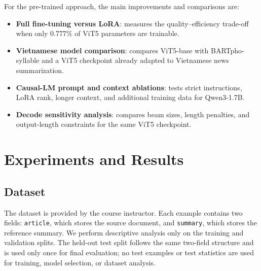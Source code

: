 \documentclass[conference]{IEEEtran}
\begin{document}
For the pre-trained approach, the main improvements and comparisons are:
\begin{itemize}
    \item \textbf{Full fine-tuning versus LoRA}: measures the quality--efficiency trade-off when only 0.777\% of ViT5 parameters are trainable.
    \item \textbf{Vietnamese model comparison}: compares ViT5-base with BARTpho-syllable and a ViT5 checkpoint already adapted to Vietnamese news summarization.
    \item \textbf{Causal-LM prompt and context ablations}: tests strict instructions, LoRA rank, longer context, and additional training data for Qwen3-1.7B.
    \item \textbf{Decode sensitivity analysis}: compares beam sizes, length penalties, and output-length constraints for the same ViT5 checkpoint.
\end{itemize}

\section{Experiments and Results}

\subsection{Dataset}
The dataset is provided by the course instructor. Each example contains two fields: \texttt{article}, which stores the source document, and \texttt{summary}, which stores the reference summary. We perform descriptive analysis only on the training and validation splits. The held-out test split follows the same two-field structure and is used only once for final evaluation; no test examples or test statistics are used for training, model selection, or dataset analysis.

\begin{table}[htbp]
\centering
\caption{Train/validation length statistics in Unicode word units.}
\label{tab:dataset}
\end{table}
\end{document}
